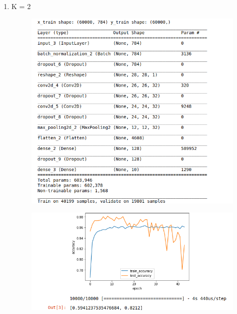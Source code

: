 \documentclass{article}
\begin{document}
\begin{enumerate}
\begin{figure}[!ht]
\begin{center}
            \end{center}
        \end{figure}
        \clearpage
    \item  K = 2
        \begin{figure}[!ht]
            \begin{center}
                \includegraphics[width=1.0\textwidth]{c1a.png}
            \end{center}
        \end{figure}
        \begin{figure}[!ht]
            \begin{center}
                \includegraphics[width=1.0\textwidth]{c1b.png}
            \end{center}
        \end{figure}

\end{enumerate}
\end{document}
